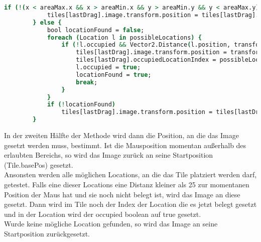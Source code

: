 {\begin{lstlisting}[language=csh, caption={Setzen der Position in der OnPointerUp Methode}]
        if (!(x < areaMax.x && x > areaMin.x && y > areaMin.y && y < areaMax.y)) {
            tiles[lastDrag].image.transform.position = tiles[lastDrag].basePos;
        } else {
            bool locationFound = false;
            foreach (Location l in possibleLocations) {
                if (!l.occupied && Vector2.Distance(l.position, transform.InverseTransformPoint(Input.mousePosition)) < 25) {
                    tiles[lastDrag].image.transform.position = transform.TransformPoint(l.position);
                    tiles[lastDrag].occupiedLocationIndex = possibleLocations.IndexOf(l);
                    l.occupied = true;
                    locationFound = true;
                    break;
                }
            }
            if (!locationFound)
                tiles[lastDrag].image.transform.position = tiles[lastDrag].basePos;
        }
\end{lstlisting}
In der zweiten Hälfte der Methode wird dann die Position, an die das Image gesetzt werden muss, bestimmt. Ist die Mausposition momentan außerhalb des erlaubten Bereichs, so wird das Image zurück an seine Startposition (Tile.basePos) gesetzt.\\
Ansonsten werden alle möglichen Locations, an die das Tile platziert werden darf, getestet. Falls eine dieser Locations eine Distanz kleiner als 25 zur momentanen Position der Maus hat und sie noch nicht belegt ist, wird das Image an diese gesetzt. Dann wird im Tile noch der Index der Location die es jetzt belegt gesetzt und in der Location wird der occupied boolean auf true gesetzt.\\
Wurde keine mögliche Location gefunden, so wird das Image an seine Startposition zurückgesetzt.\\

}
